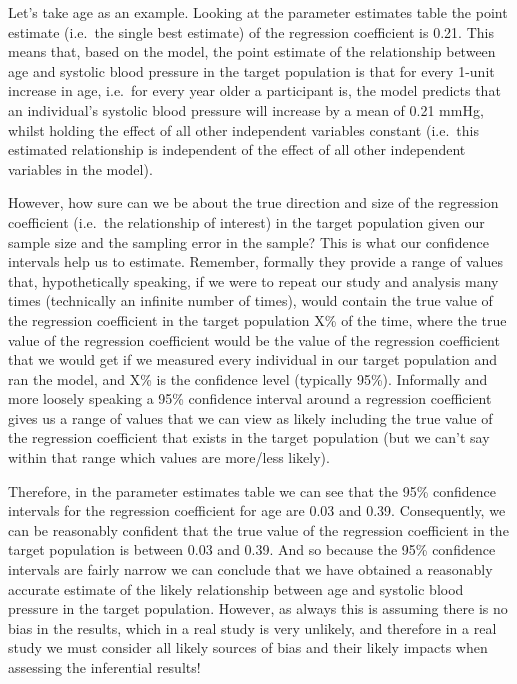 \documentclass[
]{book}
\begin{document}
Let's take age as an example. Looking at the parameter estimates table the point estimate (i.e.~the single best estimate) of the regression coefficient is 0.21. This means that, based on the model, the point estimate of the relationship between age and systolic blood pressure in the target population is that for every 1-unit increase in age, i.e.~for every year older a participant is, the model predicts that an individual's systolic blood pressure will increase by a mean of 0.21 mmHg, whilst holding the effect of all other independent variables constant (i.e.~this estimated relationship is independent of the effect of all other independent variables in the model).

However, how sure can we be about the true direction and size of the regression coefficient (i.e.~the relationship of interest) in the target population given our sample size and the sampling error in the sample? This is what our confidence intervals help us to estimate. Remember, formally they provide a range of values that, hypothetically speaking, if we were to repeat our study and analysis many times (technically an infinite number of times), would contain the true value of the regression coefficient in the target population X\% of the time, where the true value of the regression coefficient would be the value of the regression coefficient that we would get if we measured every individual in our target population and ran the model, and X\% is the confidence level (typically 95\%). Informally and more loosely speaking a 95\% confidence interval around a regression coefficient gives us a range of values that we can view as likely including the true value of the regression coefficient that exists in the target population (but we can't say within that range which values are more/less likely).

Therefore, in the parameter estimates table we can see that the 95\% confidence intervals for the regression coefficient for age are 0.03 and 0.39. Consequently, we can be reasonably confident that the true value of the regression coefficient in the target population is between 0.03 and 0.39. And so because the 95\% confidence intervals are fairly narrow we can conclude that we have obtained a reasonably accurate estimate of the likely relationship between age and systolic blood pressure in the target population. However, as always this is assuming there is no bias in the results, which in a real study is very unlikely, and therefore in a real study we must consider all likely sources of bias and their likely impacts when assessing the inferential results!
\end{document}
